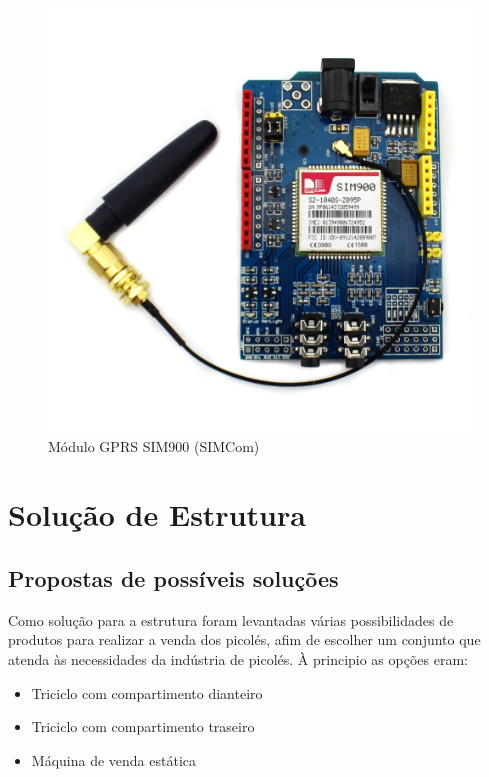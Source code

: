 \begin{figure}[H]
	\centering
    \includegraphics[scale=0.25]{figuras/modulo_gprs}
    \caption{Módulo GPRS SIM900 (SIMCom)}
    \label{fig:modulo_gprs}
\end{figure}

\section{Solução de Estrutura}

\subsection{Propostas de possíveis soluções}
Como solução para a estrutura foram levantadas várias possibilidades de produtos para realizar a venda dos picolés, afim de escolher um conjunto que atenda às necessidades da indústria de picolés. À principio as opções eram:

\begin{itemize}
\item Triciclo com compartimento dianteiro
\item Triciclo com compartimento traseiro
\item Máquina de venda estática
\end{itemize}

